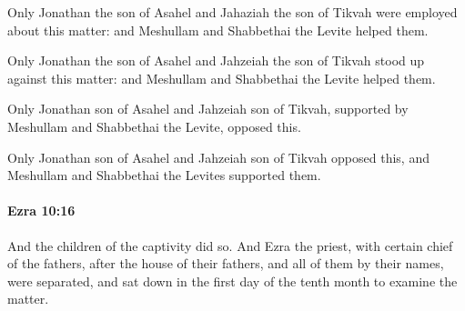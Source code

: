 			Only Jonathan the son of Asahel and Jahaziah the son of Tikvah were employed about this matter: and Meshullam and Shabbethai the Levite helped them.

			\begin{versebox}
					\item[BHS] 
					\item[LXX] 
					\item[ASV] Only Jonathan the son of Asahel and Jahzeiah the son of Tikvah stood up against this matter: and Meshullam and Shabbethai the Levite helped them.
					\item[NIV] Only Jonathan son of Asahel and Jahzeiah son of Tikvah, supported by Meshullam and Shabbethai the Levite, opposed this.
					\item[NRSV] Only Jonathan son of Asahel and Jahzeiah son of Tikvah opposed this, and Meshullam and Shabbethai the Levites supported them.
			\end{versebox}

		\paragraph{Ezra 10:16} %
			\label{EZRA-10-16}

			And the children of the captivity did so. And Ezra the priest, with certain chief of the fathers, after the house of their fathers, and all of them by their names, were separated, and sat down in the first day of the tenth month to examine the matter.

